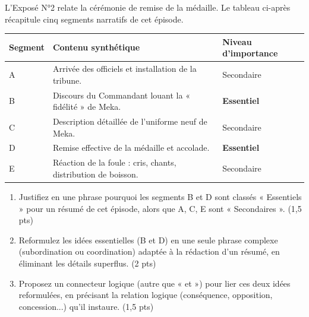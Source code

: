 \documentclass[11pt]{article}
\begin{document}
\begin{exercice}
L'Exposé N°2 relate la cérémonie de remise de la médaille. Le tableau ci-après récapitule cinq segments narratifs de cet épisode.
\begin{center}
\begin{tabularx}{\linewidth}{|>{\hsize=0.5\hsize}X|>{\hsize=2.5\hsize}X|>{\hsize=1\hsize}X|}
\hline
\textbf{Segment} & \textbf{Contenu synthétique} & \textbf{Niveau d'importance} \\
\hline
A & Arrivée des officiels et installation de la tribune. & Secondaire \\
\hline
B & Discours du Commandant louant la « fidélité » de Meka. & \textbf{Essentiel} \\
\hline
C & Description détaillée de l'uniforme neuf de Meka. & Secondaire \\
\hline
D & Remise effective de la médaille et accolade. & \textbf{Essentiel} \\
\hline
E & Réaction de la foule : cris, chants, distribution de boisson. & Secondaire \\
\hline
\end{tabularx}
\end{center}
\begin{enumerate}
    \item Justifiez en une phrase pourquoi les segments B et D sont classés « Essentiels » pour un résumé de cet épisode, alors que A, C, E sont « Secondaires ». (1,5 pts)
    \item Reformulez les idées essentielles (B et D) en une seule phrase complexe (subordination ou coordination) adaptée à la rédaction d'un résumé, en éliminant les détails superflus. (2 pts)
    \item Proposez un connecteur logique (autre que « et ») pour lier ces deux idées reformulées, en précisant la relation logique (conséquence, opposition, concession...) qu'il instaure. (1,5 pts)
\end{enumerate}
\end{exercice}
\end{document}
